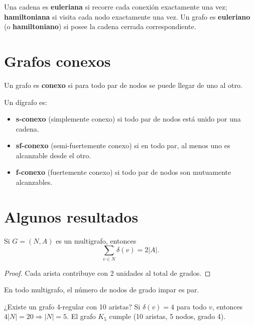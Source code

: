 \begin{definicion}
Una cadena es \textbf{euleriana} si recorre cada conexión exactamente una vez; \textbf{hamiltoniana} si visita cada nodo exactamente una vez. Un grafo es \textbf{euleriano} (o \textbf{hamiltoniano}) si posee la cadena cerrada correspondiente.
\end{definicion}

\section{Grafos conexos}

\begin{definicion}
Un grafo es \textbf{conexo} si para todo par de nodos se puede llegar de uno al otro.
\end{definicion}

\begin{definicion}
Un dígrafo es:
\begin{itemize}
  \item \textbf{s-conexo} (simplemente conexo) si todo par de nodos está unido por una cadena.
  \item \textbf{sf-conexo} (semi-fuertemente conexo) si en todo par, al menos uno es alcanzable desde el otro.
  \item \textbf{f-conexo} (fuertemente conexo) si todo par de nodos son mutuamente alcanzables.
\end{itemize}
\end{definicion}

\section{Algunos resultados}

\begin{teorema}
Si $G = (N, A)$ es un multigrafo, entonces
\[
\sum_{v \in N} \delta(v) = 2|A|.
\]
\end{teorema}
\begin{proof}
Cada arista contribuye con 2 unidades al total de grados.
\end{proof}

\begin{corolario}
En todo multigrafo, el número de nodos de grado impar es par.
\end{corolario}

\begin{ejemplo}
¿Existe un grafo 4-regular con 10 aristas? Si $\delta(v) = 4$ para todo $v$, entonces $4|N| = 20 \Rightarrow |N| = 5$. El grafo $K_5$ cumple (10 aristas, 5 nodos, grado 4).
\end{ejemplo}

